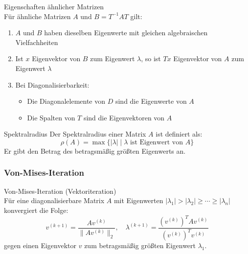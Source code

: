 \begin{theorem}{Eigenschaften ähnlicher Matrizen}\\
Für ähnliche Matrizen $A$ und $B = T^{-1}AT$ gilt:
\begin{enumerate}
    \item $A$ und $B$ haben dieselben Eigenwerte mit gleichen algebraischen Vielfachheiten
    \item Ist $x$ Eigenvektor von $B$ zum Eigenwert $\lambda$, so ist $Tx$ Eigenvektor von $A$ zum Eigenwert $\lambda$
    \item Bei Diagonalisierbarkeit:
    \begin{itemize}
        \item Die Diagonalelemente von $D$ sind die Eigenwerte von $A$
        \item Die Spalten von $T$ sind die Eigenvektoren von $A$
    \end{itemize}
\end{enumerate}
\end{theorem}

\begin{definition}{Spektralradius}
Der Spektralradius einer Matrix $A$ ist definiert als:
$$\rho(A) = \max\{|\lambda| \mid \lambda \text{ ist Eigenwert von } A\}$$
Er gibt den Betrag des betragsmäßig größten Eigenwerts an.
\end{definition}

\subsubsection{Von-Mises-Iteration}

\begin{concept}{Von-Mises-Iteration (Vektoriteration)}\\
Für eine diagonalisierbare Matrix $A$ mit Eigenwerten $|\lambda_1| > |\lambda_2| \geq \cdots \geq |\lambda_n|$ konvergiert die Folge:
$$v^{(k+1)} = \frac{Av^{(k)}}{\|Av^{(k)}\|_2}, \quad
\lambda^{(k+1)} = \frac{(v^{(k)})^TAv^{(k)}}{(v^{(k)})^Tv^{(k)}}$$
gegen einen Eigenvektor $v$ zum betragsmäßig größten Eigenwert $\lambda_1$.
\end{concept}


